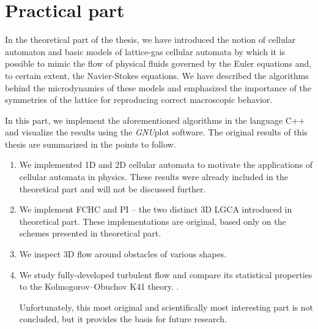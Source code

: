 

\chapter{Practical part}

In the theoretical part of the thesis, we have introduced the notion of cellular automaton and basic models of lattice-gas cellular automata by which it is possible to mimic the flow of physical fluids governed by the Euler equations and, to certain extent, the Navier-Stokes equations.
We have described the algorithms behind the microdynamics of these models and emphasized the importance of the symmetries of the lattice for reproducing correct macroscopic behavior.

In this part, we implement the aforementioned algorithms in the language C++ and visualize the results using the \textit{GNU}plot software. The original results of this thesis are summarized in the points to follow.



\begin{enumerate}
\item We implemented 1D and 2D cellular automata to motivate the applications of cellular automata in physics. These results were already included in the theoretical part and will not be discussed further.
\item We implement FCHC and PI -- the two distinct 3D LGCA introduced in theoretical part. These implementations are original, based only on the schemes presented in theoretical part.
\item We inspect 3D flow around obstacles of various shapes.
\item We study fully-developed turbulent flow and compare its statistical pro\-perties to the Kolmogorov--Obuchov K41 theory. \cite{wolf}.

Unfortunately, this most original and scientifically most interesting part is not concluded, but it provides the basis for future research. 

\end{enumerate}
